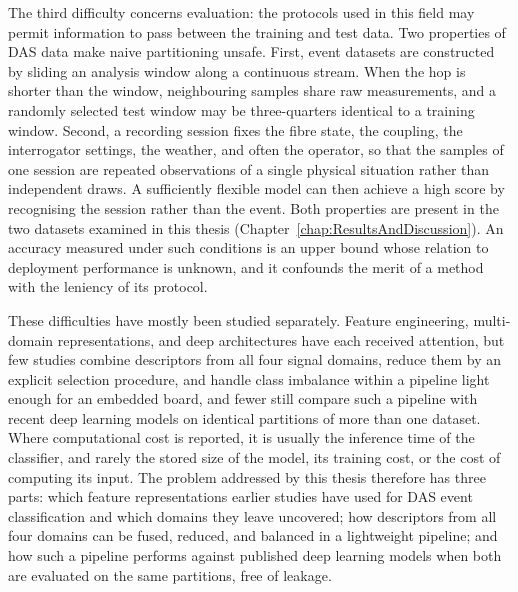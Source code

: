 The third difficulty concerns evaluation: the protocols used in this field may permit information to pass between the training and test data. Two properties of DAS data make naive partitioning unsafe. First, event datasets are constructed by sliding an analysis window along a continuous stream. When the hop is shorter than the window, neighbouring samples share raw measurements, and a randomly selected test window may be three-quarters identical to a training window. Second, a recording session fixes the fibre state, the coupling, the interrogator settings, the weather, and often the operator, so that the samples of one session are repeated observations of a single physical situation rather than independent draws. A sufficiently flexible model can then achieve a high score by recognising the session rather than the event. Both properties are present in the two datasets examined in this thesis (Chapter~\ref{chap:ResultsAndDiscussion}). An accuracy measured under such conditions is an upper bound whose relation to deployment performance is unknown, and it confounds the merit of a method with the leniency of its protocol.

These difficulties have mostly been studied separately. Feature engineering, multi-domain representations, and deep architectures have each received attention, but few studies combine descriptors from all four signal domains, reduce them by an explicit selection procedure, and handle class imbalance within a pipeline light enough for an embedded board, and fewer still compare such a pipeline with recent deep learning models on identical partitions of more than one dataset. Where computational cost is reported, it is usually the inference time of the classifier, and rarely the stored size of the model, its training cost, or the cost of computing its input. The problem addressed by this thesis therefore has three parts: which feature representations earlier studies have used for DAS event classification and which domains they leave uncovered; how descriptors from all four domains can be fused, reduced, and balanced in a lightweight pipeline; and how such a pipeline performs against published deep learning models when both are evaluated on the same partitions, free of leakage.

